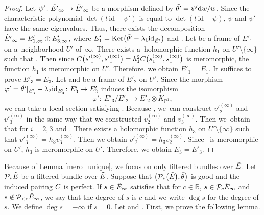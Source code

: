 \documentclass[10pt,a4paper]{amsart}
\numberwithin{equation}{section}
\newcommand{\R}{\mathbb{R}}
\newcommand{\ps}{\mathbb{P}}
\newcommand{\id}{\mathrm{id}}
\newcommand{\Ker}{\operatorname{Ker}}
\begin{document}
\begin{proof}
 Let $\psi'\colon \Tilde{E'}_{\infty}\to\Tilde{E'}_{\infty}$ be a morphism defined by $\Tilde{\theta '}= \psi' {\rm d}w/w$. Since the characteristic polynomial $\det(t\,\id- \psi')$ is equal to $\det(t\,\id- \psi)$, $\psi$ and $\psi'$ have the same eigenvalues. Thus, there exists the decomposition $\Tilde{E'}_{\infty}=E'_{1,\infty}\oplus E'_{3,\infty}$, where ${E'_1 = \Ker\bigl(\Tilde{\theta '}-\lambda_1 \id_{\Tilde{E'}}\bigr)}$ and \smash{${E'_3 = \Ker\bigl(\Tilde{\theta '}-\lambda_2 \id_{\Tilde{E'}}\bigr)^2}$}. Let  be a frame of $E'_{1}$ on a~neighborhood $U'$ of~$\infty$. There exists a~holomorphic function $h_1$ on $U'\setminus\{\infty\}$ such that . Then since $\smash{C\bigl({s'}_1^{(\infty)},{s'}_1^{(\infty)}\bigr)} = \smash{h_1^2 C\bigl(s_1^{(\infty)},s_1^{(\infty)}\bigr)}$ is meromorphic, the function $h_1$ is meromorphic on $U'$. Therefore, we obtain $E'_{1} = E_{1}$. It suffices to prove $E'_{3} = E_{3}$. Let \smash{$E'_2 = \Ker\bigl(\Tilde{\theta '}-\lambda_2 \id_{\Tilde{E'}}\bigr)$} and  be a frame of $E'_{2}$ on $U'$. Since the morphism $\varphi' = \Tilde{\theta '}|_{E'_3}-\lambda_2 \id_{E'_3} \colon E'_3\to E'_3$ induces the isomorphism
 \begin{equation*}
 \varphi' \colon \ E'_3 / E'_2 \to E'_2 \otimes K_{\ps^1},
 \end{equation*}
 we can take a local section  satisfying . Because , we~can construct ${v'}_2^{(\infty)}$ and ${v'}_3^{(\infty)}$ in the same way that we constructed $v^{(\infty)}_2$ and $v^{(\infty)}_3$. Then we~obtain that  for $i=2,3$ and . There exists a holomorphic function $h_3$ on $U'\setminus\{\infty\}$ such that ${v'}_3^{(\infty)} = h_3 v_3^{(\infty)}$. Then we obtain ${v'}_2^{(\infty)} = h_3 v_2^{(\infty)}$. Since~ is meromorphic on $U'$, $h_3$ is meromorphic on $U'$. Therefore, we obtain $E_3 = E'_3$.
\end{proof}

Because of Lemma \ref{mero_unique}, we focus on only filtered bundles over $\Tilde{E}$.
Let $\mathcal{P}_*\Tilde{E}$ be a filtered bundle over $\Tilde{E}$. Suppose that $\big(\mathcal{P}_*\bigl(\Tilde{E}\bigr),\Tilde{\theta}\big)$ is good and the induced pairing $\Tilde{C}$ is perfect. If $s\in \Tilde{E}_{\infty}$ satisfies that for $c\in\R$, $s\in \mathcal{P}_{c}\Tilde{E}_{\infty}$ and $s\notin \mathcal{P}_{<c}\Tilde{E}_{\infty}$, we say that
 the degree of $s$ is $c$ and we write $\deg{s}$ for the degree of $s$. We define $\deg{s}=-\infty$ if $s=0$. Let  and .
First, we prove the following lemma.
\end{document}
